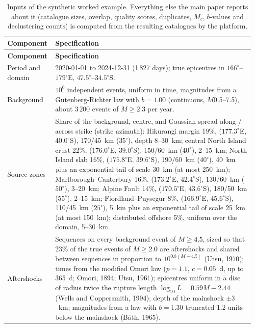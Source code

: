 \documentclass[11pt]{article}
\begin{document}
{\footnotesize
\begin{longtable}{@{}p{2.9cm}p{13.2cm}@{}}
\caption{Inputs of the synthetic worked example.  Everything else the main paper
reports about it (catalogue sizes, overlap, quality scores, duplicates, $M_c$,
$b$-values and declustering counts) is computed from the resulting catalogues by
the platform.}
\label{tab:s_generator} \\
\toprule
\textbf{Component} & \textbf{Specification} \\
\midrule
\endfirsthead
\toprule
\textbf{Component} & \textbf{Specification} \\
\midrule
\endhead
\bottomrule
\endlastfoot
Period and domain & 2020-01-01 to 2024-12-31 (1\,827 days); true epicentres in
  $166^{\circ}$--$179^{\circ}$E, $47.5^{\circ}$--$34.5^{\circ}$S. \\
Background & $10^{6}$ independent events, uniform in time, magnitudes from a
  Gutenberg-Richter law with $b = 1.00$ (continuous, $M$0.5--7.5), about
  3\,200 events of $M \geq 2.3$ per year. \\
Source zones & Share of the background, centre, and Gaussian spread along /
  across strike (strike azimuth): Hikurangi margin 19\%, ($177.3^{\circ}$E,
  $40.0^{\circ}$S), 170/45~km ($35^{\circ}$), depth 8--30~km; central North
  Island crust 22\%, ($176.0^{\circ}$E, $39.0^{\circ}$S), 150/60~km
  ($40^{\circ}$), 2--15~km; North Island slab 16\%, ($175.8^{\circ}$E,
  $39.6^{\circ}$S), 190/60~km ($40^{\circ}$), 40~km plus an exponential tail of
  scale 30~km (at most 250~km); Marlborough--Canterbury 16\%,
  ($173.2^{\circ}$E, $42.4^{\circ}$S), 130/60~km ($50^{\circ}$), 3--20~km;
  Alpine Fault 14\%, ($170.5^{\circ}$E, $43.6^{\circ}$S), 180/50~km
  ($55^{\circ}$), 2--15~km; Fiordland--Puysegur 8\%, ($166.9^{\circ}$E,
  $45.6^{\circ}$S), 110/45~km ($25^{\circ}$), 5~km plus an exponential tail of
  scale 25~km (at most 150~km); distributed offshore 5\%, uniform over the
  domain, 5--30~km. \\
Aftershocks & Sequences on every background event of $M \geq 4.5$, sized so that
  23\% of the true events of $M \geq 2.0$ are aftershocks and shared between
  sequences in proportion to $10^{0.8(M - 4.5)}$ (Utsu, 1970); times from the
  modified Omori law ($p = 1.1$, $c = 0.05$~d, up to 365~d;
  Omori, 1894; Utsu, 1961); epicentres uniform in a disc of radius twice the
  rupture length $\log_{10} L = 0.59M - 2.44$ (Wells and Coppersmith, 1994); depth of the
  mainshock $\pm 3$~km; magnitudes from a law with $b = 1.30$ truncated 1.2 units
  below the mainshock (B{\aa}th, 1965). \\

\end{longtable}}
\end{document}
